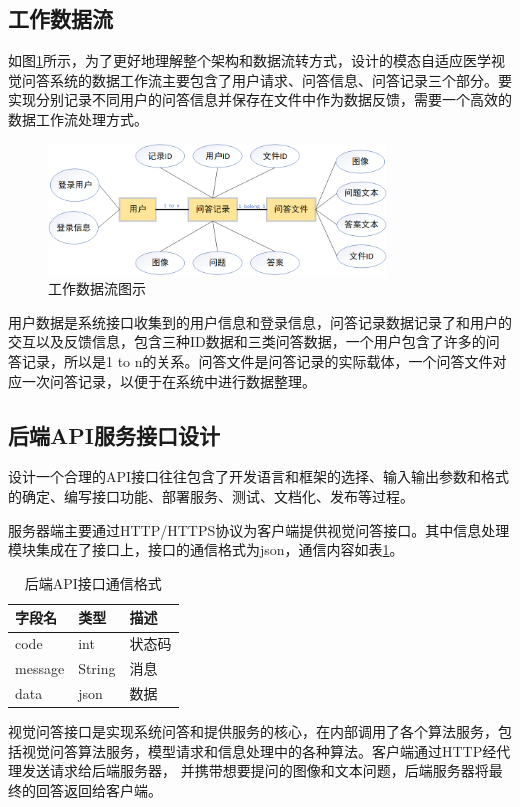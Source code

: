 \subsection{工作数据流}
如图\ref{data_string}所示，为了更好地理解整个架构和数据流转方式，设计的模态自适应医学视觉问答系统的数据工作流主要包含了用户请求、问答信息、问答记录三个部分。要实现分别记录不同用户的问答信息并保存在文件中作为数据反馈，需要一个高效的
数据工作流处理方式。
\begin{figure}[htbp]
	\centering	
	\includegraphics[width=0.8\textwidth]{Fig/myfig/chapter5/data_string.png}  %
	\caption{\label{data_string}工作数据流图示} 
\end{figure}
用户数据是系统接口收集到的用户信息和登录信息，问答记录数据记录了和用户的交互以及反馈信息，包含三种ID数据和三类问答数据，一个用户包含了许多的问答记录，所以是1 to n的关系。问答文件是问答记录的实际载体，一个问答文件对应一次问答记录，以便于在系统中进行数据整理。
\subsection{后端API服务接口设计}
设计一个合理的API接口往往包含了开发语言和框架的选择、输入输出参数和格式的确定、编写接口功能、部署服务、测试、文档化、发布等过程。

服务器端主要通过HTTP/HTTPS协议为客户端提供视觉问答接口。其中信息处理模块集成在了接口上，接口的通信格式为json，通信内容如表\ref{tab:sys_api}。
\begin{table}
    \caption{\label{tab:sys_api}后端API接口通信格式}
    \centering
    \begin{tabular}{lll}
        \hline 字段名 & 类型 & 描述  \\
        \hline code & int & 状态码  \\
		message & String & 消息 \\
		data & json & 数据 \\
        \hline
        \end{tabular}
\end{table}	
视觉问答接口是实现系统问答和提供服务的核心，在内部调用了各个算法服务，包括视觉问答算法服务，模型请求和信息处理中的各种算法。客户端通过HTTP经代理发送请求给后端服务器，
并携带想要提问的图像和文本问题，后端服务器将最终的回答返回给客户端。

